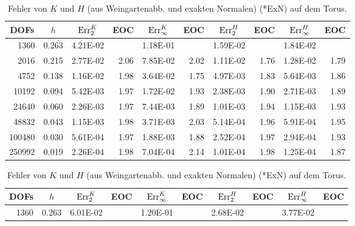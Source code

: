 \begin{beispiel}[Torus]
\begin{table}[htbp]
      \footnotesize
      \centering
      \begin{tabular}{|r|r|r|r|r|r|r|r|r|r|}
      \hline
      \multicolumn{1}{|c|}{DOFs} & \multicolumn{1}{c|}{\( h \)} & \multicolumn{1}{c|}{\( \text{Err}_{2}^{K} \)} & \multicolumn{1}{c|}{EOC} & 
        \multicolumn{1}{c|}{\( \text{Err}_{\infty}^{K} \)} & \multicolumn{1}{c|}{EOC} & \multicolumn{1}{c|}{\( \text{Err}_{2}^{H} \)} &
        \multicolumn{1}{c|}{EOC} & \multicolumn{1}{c|}{\( \text{Err}_{\infty}^{H} \)} & \multicolumn{1}{c|}{EOC} \\ \hline
        1360 & 0.263 & 4.21E-02 & \multicolumn{1}{l|}{} & 1.18E-01 & \multicolumn{1}{l|}{} & 1.59E-02 & \multicolumn{1}{l|}{} & 1.84E-02 & \multicolumn{1}{l|}{} \\ \hline
2016 & 0.215 & 2.77E-02 & 2.06 & 7.85E-02 & 2.02 & 1.11E-02 & 1.76 & 1.28E-02 & 1.79 \\ \hline
4752 & 0.138 & 1.16E-02 & 1.98 & 3.64E-02 & 1.75 & 4.97E-03 & 1.83 & 5.64E-03 & 1.86 \\ \hline
10192 & 0.094 & 5.42E-03 & 1.97 & 1.72E-02 & 1.93 & 2.38E-03 & 1.90 & 2.71E-03 & 1.89 \\ \hline
24640 & 0.060 & 2.26E-03 & 1.97 & 7.44E-03 & 1.89 & 1.01E-03 & 1.94 & 1.15E-03 & 1.93 \\ \hline
48832 & 0.043 & 1.15E-03 & 1.98 & 3.71E-03 & 2.03 & 5.14E-04 & 1.96 & 5.91E-04 & 1.95 \\ \hline
100480 & 0.030 & 5.61E-04 & 1.97 & 1.88E-03 & 1.88 & 2.52E-04 & 1.97 & 2.94E-04 & 1.93 \\ \hline
250992 & 0.019 & 2.26E-04 & 1.98 & 7.04E-04 & 2.14 & 1.01E-04 & 1.98 & 1.25E-04 & 1.87 \\ \hline
      \end{tabular}
      \caption[Gauß-/mittlere Krümmung aus Weingartenabb. auf Torus (ExN)]{Fehler von \( K \) und \( H \) (aus Weingartenabb. und
      exakten Normalen) (*ExN) auf dem Torus.}
      \label{tabWeingartenFehlerTorusExN}
      \vspace{10pt}
      \begin{tabular}{|r|r|r|r|r|r|r|r|r|r|}
      \hline
      \multicolumn{1}{|c|}{DOFs} & \multicolumn{1}{c|}{\( h \)} & \multicolumn{1}{c|}{\( \text{Err}_{2}^{K} \)} & \multicolumn{1}{c|}{EOC} & 
        \multicolumn{1}{c|}{\( \text{Err}_{\infty}^{K} \)} & \multicolumn{1}{c|}{EOC} & \multicolumn{1}{c|}{\( \text{Err}_{2}^{H} \)} &
        \multicolumn{1}{c|}{EOC} & \multicolumn{1}{c|}{\( \text{Err}_{\infty}^{H} \)} & \multicolumn{1}{c|}{EOC} \\ \hline
      1360 & 0.263 & 6.01E-02 & \multicolumn{1}{l|}{} & 1.20E-01 & \multicolumn{1}{l|}{} & 2.68E-02 & \multicolumn{1}{l|}{} & 3.77E-02 & \multicolumn{1}{l|}{} \\ \hline

\end{tabular}
\end{table}
\end{beispiel}
